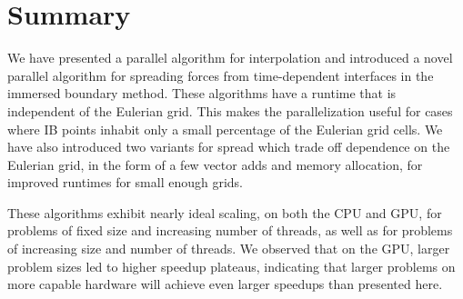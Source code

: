 \section{Summary} \label{sec:summary}

We have presented a parallel algorithm for interpolation and introduced a novel parallel
algorithm for spreading forces from time-dependent interfaces in the immersed boundary
method. These algorithms have a runtime that is independent of the Eulerian grid. This
makes the parallelization useful for cases where IB points inhabit only a small
percentage of the Eulerian grid cells. We have also introduced two variants for spread
which trade off dependence on the Eulerian grid, in the form of a few vector adds and
memory allocation, for improved runtimes for small enough grids.

These algorithms exhibit nearly ideal scaling, on both the CPU and GPU, for problems of
fixed size and increasing number of threads, as well as for problems of increasing size
and number of threads.  We observed that on the GPU, larger problem sizes led to higher
speedup plateaus, indicating that larger problems on more capable hardware will achieve
even larger speedups than presented here.

